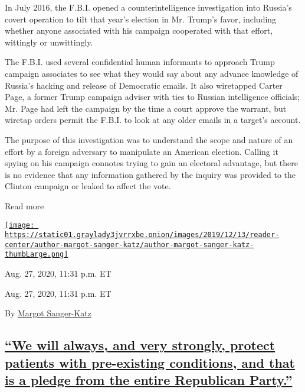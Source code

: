 In July 2016, the F.B.I. opened a counterintelligence investigation into
Russia's covert operation to tilt that year's election in Mr. Trump's
favor, including whether anyone associated with his campaign cooperated
with that effort, wittingly or unwittingly.

The F.B.I. used several confidential human informants to approach Trump
campaign associates to see what they would say about any advance
knowledge of Russia's hacking and release of Democratic emails. It also
wiretapped Carter Page, a former Trump campaign adviser with ties to
Russian intelligence officials; Mr. Page had left the campaign by the
time a court approve the warrant, but wiretap orders permit the F.B.I.
to look at any older emails in a target's account.

The purpose of this investigation was to understand the scope and nature
of an effort by a foreign adversary to manipulate an American election.
Calling it spying on his campaign connotes trying to gain an electoral
advantage, but there is no evidence that any information gathered by the
inquiry was provided to the Clinton campaign or leaked to affect the
vote.

Read more

\href{https://www.nytimes3xbfgragh.onion/by/margot-sanger-katz}{\texttt{[image: https://static01.graylady3jvrrxbe.onion/images/2019/12/13/reader-center/author-margot-sanger-katz/author-margot-sanger-katz-thumbLarge.png]}}

Aug. 27, 2020, 11:31 p.m. ET

Aug. 27, 2020, 11:31 p.m. ET

By
\href{https://www.nytimes3xbfgragh.onion/by/margot-sanger-katz}{Margot
Sanger-Katz}

\hypertarget{we-will-always-and-very-strongly-protect-patients-with-pre-existing-conditions-and-that-is-a-pledge-from-the-entire-republican-party}{%
\subsection{\texorpdfstring{\protect\hyperlink{we-will-always-and-very-strongly-protect-patients-with-pre-existing-conditions-and-that-is-a-pledge-from-the-entire-republican-p}{``We
will always, and very strongly, protect patients with pre-existing
conditions, and that is a pledge from the entire Republican
Party.''}}{``We will always, and very strongly, protect patients with pre-existing conditions, and that is a pledge from the entire Republican Party.''}}\label{we-will-always-and-very-strongly-protect-patients-with-pre-existing-conditions-and-that-is-a-pledge-from-the-entire-republican-party}}

